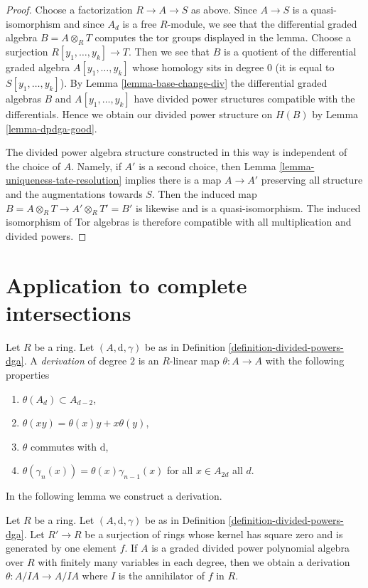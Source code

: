 \begin{proof}
Choose a factorization $R \to A \to S$ as above. Since $A \to S$
is a quasi-isomorphism and since $A_d$ is a free $R$-module,
we see that the differential graded algebra $B = A \otimes_R T$ computes
the tor groups displayed in the lemma. Choose a surjection
$R[y_1, \ldots, y_k] \to T$. Then we see that
$B$ is a quotient of the differential graded algebra
$A[y_1, \ldots, y_k]$ whose homology sits in degree $0$ (it is equal
to $S[y_1, \ldots, y_k]$).
By Lemma \ref{lemma-base-change-div} the differential graded algebras $B$ and
$A[y_1, \ldots, y_k]$ have divided power structures compatible
with the differentials. Hence we obtain our divided
power structure on $H(B)$ by Lemma \ref{lemma-dpdga-good}.

\medskip\noindent
The divided power algebra structure constructed in this way is independent
of the choice of $A$. Namely, if $A'$ is a second choice, then
Lemma \ref{lemma-uniqueness-tate-resolution}
implies there is a map $A \to A'$ preserving all structure and the
augmentations towards $S$. Then the induced map
$B = A \otimes_R T \to A' \otimes_R T' = B'$ is likewise
and is a quasi-isomorphism. The induced isomorphism of
Tor algebras is therefore compatible with all multiplication
and divided powers.
\end{proof}





\section{Application to complete intersections}
\label{section-application-ci}

\noindent
Let $R$ be a ring. Let $(A, \text{d}, \gamma)$ be as in
Definition \ref{definition-divided-powers-dga}.
A {\it derivation} of degree $2$ is an $R$-linear
map $\theta : A \to A$ with the following
properties
\begin{enumerate}
\item $\theta(A_d) \subset A_{d - 2}$,
\item $\theta(xy) = \theta(x)y + x\theta(y)$,
\item $\theta$ commutes with $\text{d}$,
\item $\theta(\gamma_n(x)) = \theta(x) \gamma_{n - 1}(x)$
for all $x \in A_{2d}$ all $d$.
\end{enumerate}
In the following lemma we construct a derivation.

\begin{lemma}
\label{lemma-get-derivation}
Let $R$ be a ring. Let $(A, \text{d}, \gamma)$ be as in
Definition \ref{definition-divided-powers-dga}.
Let $R' \to R$ be a surjection of rings whose kernel
has square zero and is generated by one element $f$.
If $A$ is a graded divided power polynomial algebra over $R$
with finitely many variables in each degree,
then we obtain a derivation
$\theta : A/IA \to A/IA$ where $I$ is the annihilator
of $f$ in $R$.
\end{lemma}

